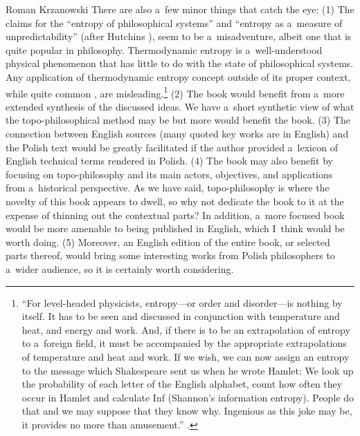 \begin{newrevengenv}{Roman Krzanowski}
There are also a~few minor things that catch the eye: (1) The claims for the ``entropy of philosophical systems'' 
\parencite[][p.172]{skowron_czesc_2021} %
 and ``entropy as a~measure of unpredictability'' (after Hutchins 
\parencite*[][]{hutchins_concepts_2012}%
), seem to be a~misadventure, albeit one that is quite popular in philosophy. Thermodynamic entropy is a~well-understood physical phenomenon that has little to do with the state of philosophical systems. Any application of thermodynamic entropy concept outside of its proper context, while quite common 
\parencite[see e.g.,][]{muller_history_2007}, %
 are misleading.\footnote{``For level-headed physicists, entropy---or order and disorder---is nothing by itself. It has to be seen and discussed in conjunction with temperature and heat, and energy and work. And, if there is to be an extrapolation of entropy to a~foreign field, it must be accompanied by the appropriate extrapolations of temperature and heat and work. If we wish, we can now assign an entropy to the message which Shakespeare sent us when he wrote Hamlet: We look up the probability of each letter of the English alphabet, count how often they occur in Hamlet and calculate Inf (Shannon's information entropy). People do that and we may suppose that they know why. Ingenious as this joke may be, it provides no more than amusement.'' 
\parencite[][pp.133–134]{muller_history_2007}. %
 } (2) The book would benefit from a~more extended synthesis of the discussed ideas. We have a~short synthetic view of what the topo-philosophical method may be but more would benefit the book. (3) The connection between English sources (many quoted key works are in English) and the Polish text would be greatly facilitated if the author provided a~lexicon of English technical terms rendered in Polish. (4) The book may also benefit by focusing on topo-philosophy and its main actors, objectives, and applications from a~historical perspective. As we have said, topo-philosophy is where the novelty of this book appears to dwell, so why not dedicate the book to it at the expense of thinning out the contextual parts? In addition, a~more focused book would be more amenable to being published in English, which I~think would be worth doing. (5) Moreover, an English edition of the entire book, or selected parts thereof, would bring some interesting works from Polish philosophers to a~wider audience, so it is certainly worth considering.




\end{newrevengenv}
